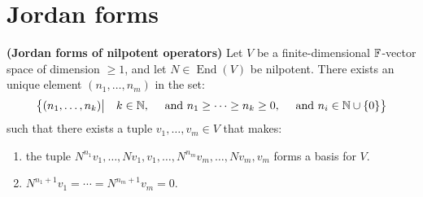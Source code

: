 \documentclass{report}
\begin{document}
\section{Jordan forms}
\label{JF}
\begin{theorem}
\label{JfNO}
\textbf{(Jordan forms of nilpotent operators)} Let $V$ be a finite-dimensional $\mathbb{F}$-vector space of dimension $\geq 1$, and let $N \in \operatorname{End}(V)$ be nilpotent. There exists an unique element $(n_1,\dots ,n_m)$ in the set: 
\begin{align*}
\left\{ (n_1,\dots ,n_k) \big |\quad  k \in\mathbb{N},\quad \text{ and }n_1\geq \cdots \geq  n_k \geq 0 ,\quad \text{ and } n_i \in\mathbb{N} \cup  \left\{ 0 \right\}  \right\}
\end{align*}
such that there exists a tuple $v_1,\dots ,v_m \in V$ that makes: 
\begin{enumerate}[label=(\alph*)]
  \item the tuple $N^{n_1}v_1,\dots ,Nv_1,v_1,\dots ,N^{n_m}v_m,\dots ,Nv_m,v_m$ forms a basis for $V$. 
  \item $N^{n_1+1}v_1=\cdots = N^{n_m+1}v_m=0$. 
\end{enumerate}
\end{theorem}
\end{document}
